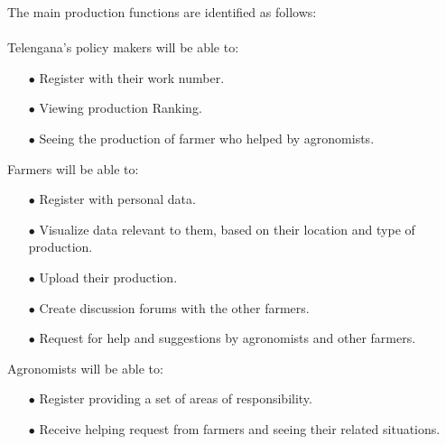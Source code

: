 \documentclass[../../main.tex]{subfiles}
\begin{document}
The main production functions are identified as follows:\\ \\
Telengana's policy makers will be able to:
\begin{itemize}
\item[$\bullet$]Register with their work number.
\item[$\bullet$] Viewing production Ranking.
\item[$\bullet$] Seeing the  production of farmer who helped by agronomists.
\end{itemize}

Farmers will be able to:
\begin{itemize}
\item[$\bullet$]Register with personal data.
\item[$\bullet$]Visualize data relevant to them, based on their location and type of production.
\item[$\bullet$] Upload their production.
\item[$\bullet$] Create discussion forums with the other farmers.
\item[$\bullet$] Request for help and suggestions by agronomists and other farmers.
\end{itemize}

Agronomists will be able to:
\begin{itemize}
\item[$\bullet$]Register providing a set of areas of responsibility.
\item[$\bullet$]Receive helping request from farmers and seeing their related situations.
\end{itemize}
\end{document}

